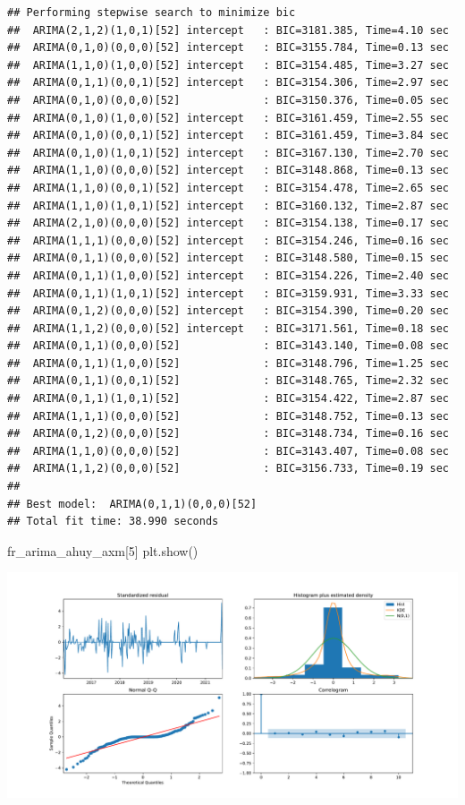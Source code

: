 \documentclass[
]{book}
\newenvironment{Shaded}{\begin{snugshade}}{\end{snugshade}}
\newcommand{\DecValTok}[1]{\textcolor[rgb]{0.00,0.00,0.81}{#1}}
\newcommand{\NormalTok}[1]{#1}
\begin{document}
\begin{verbatim}
## Performing stepwise search to minimize bic
##  ARIMA(2,1,2)(1,0,1)[52] intercept   : BIC=3181.385, Time=4.10 sec
##  ARIMA(0,1,0)(0,0,0)[52] intercept   : BIC=3155.784, Time=0.13 sec
##  ARIMA(1,1,0)(1,0,0)[52] intercept   : BIC=3154.485, Time=3.27 sec
##  ARIMA(0,1,1)(0,0,1)[52] intercept   : BIC=3154.306, Time=2.97 sec
##  ARIMA(0,1,0)(0,0,0)[52]             : BIC=3150.376, Time=0.05 sec
##  ARIMA(0,1,0)(1,0,0)[52] intercept   : BIC=3161.459, Time=2.55 sec
##  ARIMA(0,1,0)(0,0,1)[52] intercept   : BIC=3161.459, Time=3.84 sec
##  ARIMA(0,1,0)(1,0,1)[52] intercept   : BIC=3167.130, Time=2.70 sec
##  ARIMA(1,1,0)(0,0,0)[52] intercept   : BIC=3148.868, Time=0.13 sec
##  ARIMA(1,1,0)(0,0,1)[52] intercept   : BIC=3154.478, Time=2.65 sec
##  ARIMA(1,1,0)(1,0,1)[52] intercept   : BIC=3160.132, Time=2.87 sec
##  ARIMA(2,1,0)(0,0,0)[52] intercept   : BIC=3154.138, Time=0.17 sec
##  ARIMA(1,1,1)(0,0,0)[52] intercept   : BIC=3154.246, Time=0.16 sec
##  ARIMA(0,1,1)(0,0,0)[52] intercept   : BIC=3148.580, Time=0.15 sec
##  ARIMA(0,1,1)(1,0,0)[52] intercept   : BIC=3154.226, Time=2.40 sec
##  ARIMA(0,1,1)(1,0,1)[52] intercept   : BIC=3159.931, Time=3.33 sec
##  ARIMA(0,1,2)(0,0,0)[52] intercept   : BIC=3154.390, Time=0.20 sec
##  ARIMA(1,1,2)(0,0,0)[52] intercept   : BIC=3171.561, Time=0.18 sec
##  ARIMA(0,1,1)(0,0,0)[52]             : BIC=3143.140, Time=0.08 sec
##  ARIMA(0,1,1)(1,0,0)[52]             : BIC=3148.796, Time=1.25 sec
##  ARIMA(0,1,1)(0,0,1)[52]             : BIC=3148.765, Time=2.32 sec
##  ARIMA(0,1,1)(1,0,1)[52]             : BIC=3154.422, Time=2.87 sec
##  ARIMA(1,1,1)(0,0,0)[52]             : BIC=3148.752, Time=0.13 sec
##  ARIMA(0,1,2)(0,0,0)[52]             : BIC=3148.734, Time=0.16 sec
##  ARIMA(1,1,0)(0,0,0)[52]             : BIC=3143.407, Time=0.08 sec
##  ARIMA(1,1,2)(0,0,0)[52]             : BIC=3156.733, Time=0.19 sec
## 
## Best model:  ARIMA(0,1,1)(0,0,0)[52]          
## Total fit time: 38.990 seconds
\end{verbatim}

\begin{Shaded}
\begin{Highlighting}[]
\NormalTok{fr\_arima\_ahuy\_axm[}\DecValTok{5}\NormalTok{]}
\NormalTok{plt.show()}
\end{Highlighting}
\end{Shaded}

\includegraphics{bookdown-demo_files/figure-latex/unnamed-chunk-148-135.pdf}
\end{document}
